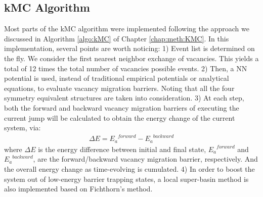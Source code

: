 \subsection{\acf{kMC} Algorithm}
Most parts of the \ac{kMC} algorithm were implemented following the approach we discussed in Algorithm \ref{algo:kMC} of Chapter \ref{chap:meth:KMC}. In this implementation, several points are worth noticing: 1) Event list is determined on the fly. We consider the first nearest neighbor exchange of vacancies. This yields a total of 12 times the total number of vacancies possible events. 2) Then, a \ac{NN} potential is used, instead of traditional empirical potentials or analytical equations, to evaluate vacancy migration barriers. Noting that all the four symmetry equivalent structures are taken into consideration. 3) At each step, both the forward and backward vacancy migration barriers of executing the current jump will be calculated to obtain the energy change of the current system, via:
\begin{align}
\Delta E = {E_a}^{forward} - {E_a}^{backward}
\label{Chap:Al/Vac:eq:barrier-EDiff}
\end{align}
where $\Delta E$ is the energy difference between initial and final state, ${E_a}^{forward}$ and ${E_a}^{backward}$, are the forward/backward vacancy migration barrier, respectively. And the overall energy change as time-evolving is cumulated. 4) In order to boost the system out of low-energy barrier trapping states, a local super-basin method is also implemented based on Fichthorn's method\cite{fichthorn2013local}.


